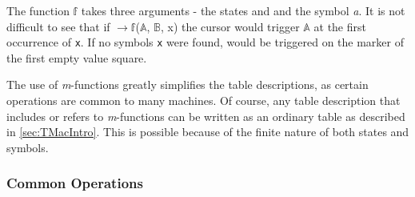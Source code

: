 \documentclass[Master.tex]{subfiles}
\begin{document}
\medskip

The function $\mathbb{f}$ takes three arguments - the states  and  and the symbol \textit{a}. It is not difficult to see that if $\rightarrow \mathbb{f}$($\mathbb{A}$, $\mathbb{B}$, x) the cursor would trigger $\mathbb{A}$ at the first occurrence of \texttt{x}. If no symbols \texttt{x} were found,  would be triggered on the marker of the first empty value square.

The use of \textit{m}-functions greatly simplifies the table descriptions, as certain operations are common to many machines. Of course, any table description that includes or refers to \textit{m}-functions can be written as an ordinary table as described in \cref{sec:TMacIntro}. This is possible because of the finite nature of both states and symbols.

\subsubsection{Common Operations}
\end{document}

